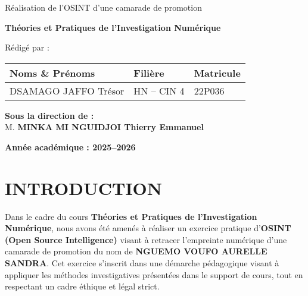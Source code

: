 \documentclass[12pt, a4paper]{article}
\begin{document}
\begin{titlepage}

	\vspace{1cm}

	{\Large Réalisation de l'OSINT d'une camarade de promotion}

	\vspace{0.5cm}

	{\LARGE \textbf{Théories et Pratiques de l'Investigation Numérique}}

	\vspace{2cm}

	{\large Rédigé par :}

	\vspace{0.5cm}

	\begin{tabular}{|>{\centering\arraybackslash}m{8cm}
		|>{\centering\arraybackslash}m{4cm}
		|>{\centering\arraybackslash}m{3cm}|}
		\hline
		\textbf{Noms \& Prénoms} & \textbf{Filière} & \textbf{Matricule} \\
		\hline
		DSAMAGO JAFFO Trésor     & HN -- CIN 4      & 22P036             \\
		\hline
	\end{tabular}

	\vfill

	\begin{Large}
		\textbf{Sous la direction de :} \\
		M. \textbf{MINKA MI NGUIDJOI Thierry Emmanuel} \\
	\end{Large}

	\vspace{1cm}

	\textbf{Année académique : 2025--2026}
\end{titlepage}

\tableofcontents
\newpage

\section*{INTRODUCTION}

Dans le cadre du cours \textbf{Théories et Pratiques de l'Investigation Numérique}, nous avons été amenés à réaliser un exercice pratique d'\textbf{OSINT (Open Source Intelligence)} visant à retracer l'empreinte numérique d'une camarade de promotion du nom de \textbf{NGUEMO VOUFO AURELLE SANDRA}. Cet exercice s'inscrit dans une démarche pédagogique visant à appliquer les méthodes investigatives présentées dans le support de cours, tout en respectant un cadre éthique et légal strict.
\end{document}
